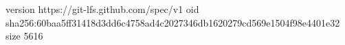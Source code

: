 version https://git-lfs.github.com/spec/v1
oid sha256:60baa5ff31418d3dd6c4758ad4c2027346db1620279cd569e1504f98e4401e32
size 5616

